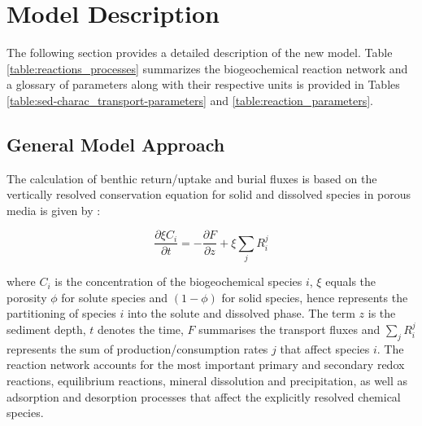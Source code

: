 \documentclass[gmd, manuscript]{copernicus}
\begin{document}
\section{Model Description}
The following section provides a detailed description of the new model. Table \ref{table:reactions_processes} summarizes the biogeochemical reaction network and 
a glossary of parameters along with their respective units is provided in Tables \ref{table:sed-charac_transport-parameters} and \ref{table:reaction_parameters}.

\subsection {General Model Approach} \label{subsec:GeneralModelApproach}
The calculation of benthic return/uptake and burial fluxes is based on the vertically resolved conservation equation for solid and dissolved species in porous media is given by 
\citep[e.g.][]{berner_early_1980, boudreau1997diagenetic}:

\begin{equation} 
\frac{\partial \xi C_i}{\partial t}=-\frac{\partial F}{\partial z}+\xi \sum_j R_i^j \label{eq:Eq_generaldiagenetic}
\end{equation}

where $C_i$ is the concentration of the biogeochemical species $i$, $\xi$ equals the porosity $\phi$ for solute species and $(1-\phi)$ for solid species, hence represents the partitioning of species $i$ 
into the solute and dissolved phase. The term $z$ is the sediment depth, $t$ denotes the time, $F$ summarises the transport fluxes and $\sum_j R_i^j$ represents the sum of production/consumption rates $j$ 
that affect species $i$. The reaction network accounts for the most important primary and secondary redox reactions, equilibrium reactions, mineral dissolution and precipitation, as well as adsorption 
and desorption processes that affect the explicitly resolved chemical species. 
\end{document}
